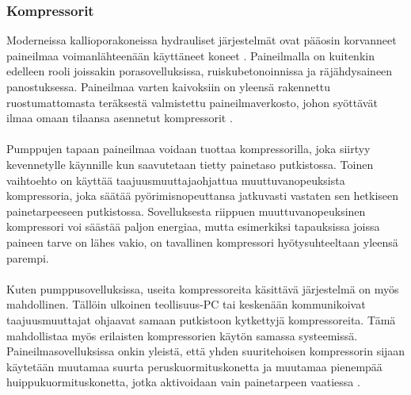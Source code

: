 \documentclass[finnish,12pt,a4paper,pdftex,elec,utf8]{aaltothesis}
\begin{document}
\subsubsection{Kompressorit}
Moderneissa kallioporakoneissa hydrauliset järjestelmät ovat pääosin korvanneet paineilmaa voimanlähteenään käyttäneet koneet \cite[s. 143]{Hakapää}. Paineilmalla on kuitenkin edelleen rooli joissakin porasovelluksissa, ruiskubetonoinnissa ja räjähdysaineen panostuksessa. Paineilmaa varten kaivoksiin on yleensä rakennettu ruostumattomasta teräksestä valmistettu paineilmaverkosto, johon syöttävät ilmaa omaan tilaansa asennetut kompressorit \cite[s. 269]{Hakapää}.
\\\\
Pumppujen tapaan paineilmaa voidaan tuottaa kompressorilla, joka siirtyy kevennetylle käynnille kun saavutetaan tietty painetaso putkistossa. Toinen vaihtoehto on käyttää taajuusmuuttajaohjattua muuttuvanopeuksista kompressoria, joka säätää pyörimisnopeuttansa jatkuvasti vastaten sen hetkiseen painetarpeeseen putkistossa. \cite[s. 269]{Hakapää} Sovelluksesta riippuen muuttuvanopeuksinen kompressori voi säästää paljon energiaa, mutta esimerkiksi tapauksissa joissa paineen tarve on lähes vakio, on tavallinen kompressori hyötysuhteeltaan yleensä parempi.
\\\\
Kuten pumppusovelluksissa, useita kompressoreita käsittävä järjestelmä on myös mahdollinen. Tällöin ulkoinen teollisuus-PC tai keskenään kommunikoivat taajuusmuuttajat ohjaavat samaan putkistoon kytkettyjä kompressoreita. Tämä mahdollistaa myös erilaisten kompressorien käytön samassa systeemissä. Paineilmasovelluksissa onkin yleistä, että yhden suuritehoisen kompressorin sijaan käytetään muutamaa suurta peruskuormituskonetta ja muutamaa pienempää huippukuormituskonetta, jotka aktivoidaan vain painetarpeen vaatiessa \cite[s. 269]{Hakapää}.
\clearpage
\end{document}
